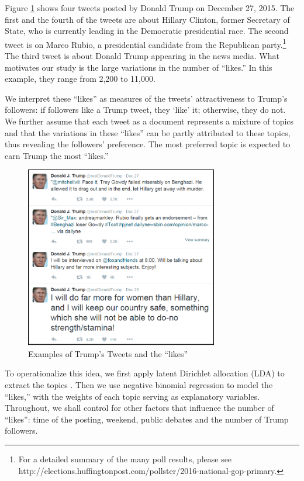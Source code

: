 \documentclass[letterpaper]{article}
\begin{document}
Figure \ref{gallery} shows four tweets posted by Donald Trump on December 27, 2015. The first and the fourth of the tweets are about Hillary Clinton, former Secretary of State, who is currently leading in the Democratic presidential race. The second tweet is on Marco Rubio, a presidential candidate from the Republican party.\footnote{For a detailed summary of the many poll results, please see http://elections.huffingtonpost.com/pollster/2016-national-gop-primary.} The third tweet is about Donald Trump appearing in the news media. What motivates our study is the large variations in the number of ``likes.'' In this example, they range from 2,200 to 11,000.

We interpret these ``likes'' as measures of the tweets' attractiveness to Trump's followers: if followers like a Trump tweet, they `like' it; otherwise, they do not. We further assume that each tweet as a document represents a mixture of topics and that the variations in these ``likes'' can be partly attributed to these topics, thus revealing the followers' preference. The most preferred topic is expected to earn Trump the most ``likes.''
 
\begin{figure}[H]
\caption{Examples of Trump's Tweets and the ``likes''}
\label{gallery}
\includegraphics[height=7.96cm]{trump-like-framed.png}
\end{figure}

To operationalize this idea, we first apply latent Dirichlet allocation (LDA) to extract the topics \cite{lda,LDA2}. Then we use negative binomial regression to model the ``likes,'' with the weights of each topic serving as explanatory variables. Throughout, we shall control for other factors that influence the number of ``likes'': time of the posting, weekend, public debates and the number of Trump followers.
\end{document}
